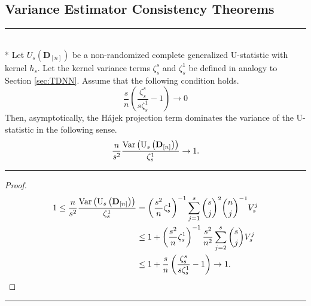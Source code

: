 \subsection{Variance Estimator Consistency Theorems}
\hrule

\begin{lem}\label{lem:Hajek_Dominance}\mbox{}\\*
	Let $U_{s}\left(\mathbf{D}_{[n]}\right)$ be a non-randomized complete generalized U-statistic with kernel $h_s$.
	Let the kernel variance terms $\zeta_{s}^{s}$ and $\zeta_{s}^{1}$ be defined in analogy to Section \ref{sec:TDNN}.
	Assume that the following condition holds.
	\begin{equation}
		\frac{s}{n}\left(\frac{\zeta_{s}^{s}}{s \zeta_{s}^{1}} - 1\right) \rightarrow 0
	\end{equation}
	Then, asymptotically, the H\'ajek projection term dominates the variance of the U-statistic in the following sense.
	\begin{equation}
		\frac{n}{s^2}\frac{\text{Var}\left(\mathrm{U}_{s}\left(\mathbf{D}_{[n]}\right)\right)}{\zeta_{s}^{1}}
		\rightarrow 1.
	\end{equation}
\end{lem}
\hrule
\begin{proof}
	\begin{equation}
		\begin{aligned}
			1 \leq \frac{n}{s^2}\frac{\text{Var}\left(\mathrm{U}_{s}\left(\mathbf{D}_{[n]}\right)\right)}{\zeta_{s}^{1}}
			 & = \left(\frac{s^2}{n} \zeta_{s}^{1}\right)^{-1} \sum_{j=1}^{s}\binom{s}{j}^2\binom{n}{j}^{-1} V_{s}^{j}     \\
			 & \leq 1 + \left(\frac{s^2}{n} \zeta_{s}^{1}\right)^{-1} \frac{s^2}{n^2} \sum_{j=2}^{s}\binom{s}{j} V_{s}^{j} \\
			 & \leq 1 + \frac{s}{n}\left(\frac{\zeta_{s}^{s}}{s\zeta_{s}^{1}} - 1\right)
			\rightarrow 1.
		\end{aligned}
	\end{equation}
\end{proof}

\hrule

